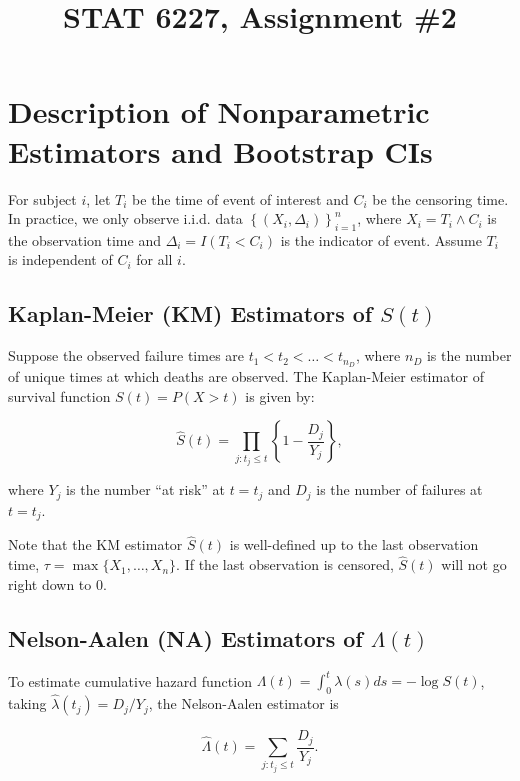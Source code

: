 \documentclass[11pt]{article}
\newcommand{\hS}{\hat{S}}
\newcommand{\hlam}{\hat{\lambda}}
\newcommand{\hLam}{\hat{\Lambda}}
\begin{document}
\title{STAT 6227, Assignment \#2}

\maketitle

\section{Description of Nonparametric Estimators and Bootstrap CIs}
For subject $i$, let $T_i$ be the time of event of interest and $C_i$ be the
censoring time. In practice, we only observe i.i.d. data $\left\{ (X_i,
  \Delta_i) \right\}_{i=1}^n$, where $X_i = T_i\wedge C_i$ is the observation time
and $\Delta_i = I(T_i<C_i)$ is the indicator of event. Assume $T_i$ is
independent of $C_i$ for all $i$.

\subsection{Kaplan-Meier (KM) Estimators of $S(t)$}
Suppose the observed failure times are $t_1<t_2<\dots < t_{n_D}$, where $n_D$ is
the number of unique times at which deaths are observed. The Kaplan-Meier
estimator of survival function $S(t) = P(X>t)$ is given by:

\begin{equation}
\label{eq:KM}
\hS (t) = \prod_{j:t_j\leq t} \left\{ 1-\frac{D_j}{Y_j} \right\},
\end{equation}

where $Y_j$ is the number ``at risk'' at $t=t_j$ and $D_j$ is the number of
failures at $t = t_j$.

Note that the KM estimator $\hS(t)$ is well-defined up to the last observation
time, $\tau = \max \{X_1,\dots,X_n\}$. If the last observation is censored,
$\hS(t)$ will not go right down to 0.

\subsection{Nelson-Aalen (NA) Estimators of $\Lambda (t)$}

To estimate cumulative hazard function $\Lambda (t) = \int_0^t \lambda (s) ds =
-\log S(t)$,
taking $\hlam (t_j) = D_j/Y_j$, the Nelson-Aalen estimator is

\begin{equation}
\label{eq:NA}
\hLam (t) = \sum_{j:t_j\leq t} \frac{D_j}{Y_j}.
\end{equation}
\end{document}
